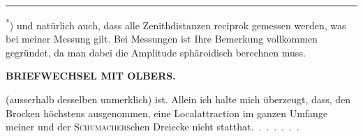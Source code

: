 \par\smallskip\noindent\rule{.24\textwidth}{.4pt}\par\smallskip
{\footnotesize
\noindent\hspace*{.06\linewidth}\textsuperscript{*}) und natürlich auch, dass alle Zenithdistanzen reciprok gemessen werden, was bei meiner Messung
 gilt. Bei  Messungen ist Ihre Bemerkung vollkommen gegründet, da
man dabei die Amplitude sphäroidisch berechnen muss.\par
}

\clearpage
\noindent{}\hfill{\small\textbf{BRIEFWECHSEL MIT OLBERS.}}\hfill\null\par\medskip
\noindent (ausserhalb desselben unmerklich) ist. Allein ich halte mich überzeugt, dass,
den Brocken höchstens ausgenommen, eine  Localattraction im ganzen
Umfange meiner und der \textsc{Schumachers}chen Dreiecke nicht statthat.\ \mbox{.\ .\ .\ .\ .\ .}
